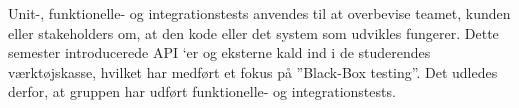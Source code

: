 Unit-, funktionelle- og integrationstests anvendes til at overbevise teamet, 
kunden eller stakeholders om, at den kode eller det system som udvikles fungerer. 
Dette semester introducerede API ‘er og eksterne kald ind i de studerendes værktøjskasse, 
hvilket har medført et fokus på ”Black-Box testing”.  Det udledes derfor, at gruppen har udført 
funktionelle- og integrationstests. \\
